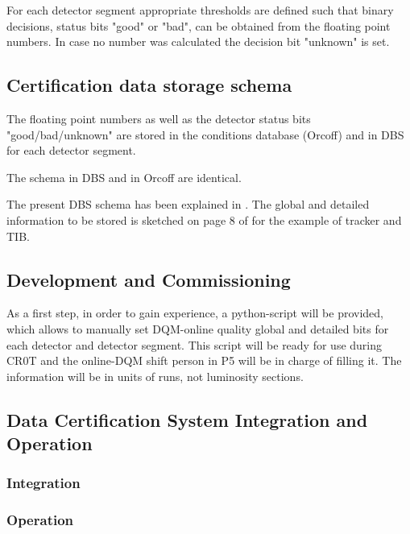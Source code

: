 For each detector segment appropriate thresholds are defined such that binary decisions, status bits "good" or "bad", can be obtained from the floating point numbers. In case no number was calculated
the decision bit "unknown" is set.

\subsection{Certification data storage schema}
\label{sec:cert:schema}

The floating point numbers as well as the detector status bits "good/bad/unknown" are stored in the conditions database (Orcoff) and in DBS for  each detector segment.

The schema in DBS and in Orcoff are identical.

The present DBS schema has been explained in \cite{datacert:gutsche}. The global and detailed information to be stored is sketched on page 8  of \cite{datacert:gutsche} for the example of tracker and TIB. 

\subsection{Development and Commissioning}
\label{sec:cert:plan}

As a first step, in order to gain experience, a python-script will be provided, which allows to manually set DQM-online quality global and detailed bits for each detector and detector segment. This script will be ready for use during CR0T and the online-DQM shift person in P5 will be in charge of filling it. The information will be in units of runs, not luminosity sections.


\subsection{Data Certification System  Integration and Operation}

\subsubsection*{Integration}
\subsubsection*{Operation}
